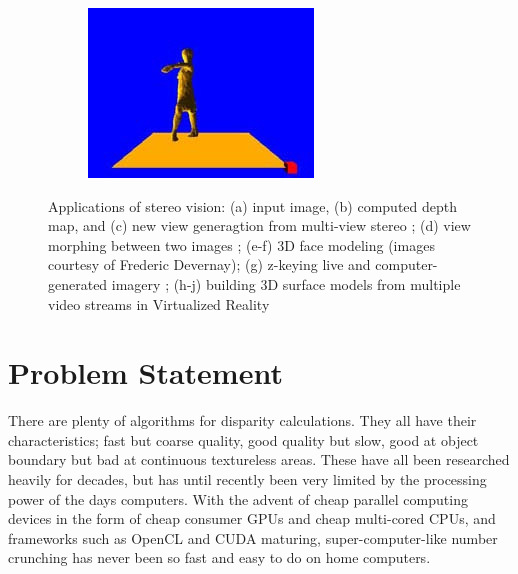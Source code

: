 \begin{figure}
\begin{subfigure}[b]{0.3\textwidth}
    \includegraphics[width=\textwidth]{images/3d-reconstruction.png}
    \caption{}
  \end{subfigure}

  \caption{Applications of stereo vision: (a) input image, (b)
    computed depth map, and (c) new view generagtion from multi-view
    stereo \cite{matthies-kanade-szeliski}; (d) view morphing between
    two images \cite{seitz-dyer}; (e-f) 3D face modeling (images
    courtesy of Frederic Devernay); (g) z-keying live and
    computer-generated imagery \cite{kanade-yoshida-oda}; (h-j)
    building 3D surface models from multiple video streams in
    Virtualized Reality \cite{kanade-rander-narayanan}}
\end{figure}



\section{Problem Statement}\label{sect:prob-statement}

There are plenty of algorithms for disparity calculations. They all
have their characteristics; fast but coarse quality, good quality but
slow, good at object boundary but bad at continuous textureless areas.
These have all been researched heavily for decades, but has until
recently been very limited by the processing power of the days
computers. With the advent of cheap parallel computing devices in the
form of cheap consumer GPUs and cheap multi-cored CPUs, and frameworks
such as OpenCL and CUDA maturing, super-computer-like number crunching
has never been so fast and easy to do on home computers.

